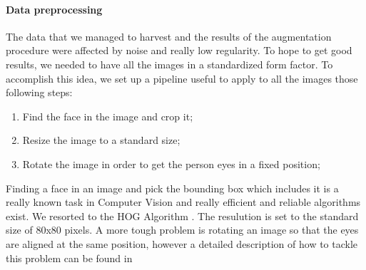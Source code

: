 \paragraph{Data preprocessing}
The data that we managed to harvest and the results of the augmentation procedure were affected by noise and really low regularity. To hope to get good results, we needed to have all the images in a standardized form factor. To accomplish this idea, we set up a pipeline useful to apply to all the images those following steps:

\begin{enumerate}
\item Find the face in the image and crop it;
\item Resize the image to a standard size;
\item Rotate the image in order to get the person eyes in a fixed position;
\end{enumerate}

Finding a face in an image and pick the bounding box which includes it is a really known task in Computer Vision and really efficient and reliable algorithms exist. We resorted to the HOG Algorithm \cite{hog}. The resulution is set to the standard size of 80x80 pixels. A more tough problem is rotating an image so that the eyes are aligned at the same position, however a detailed description of how to tackle this problem can be found in \cite{facealign}

